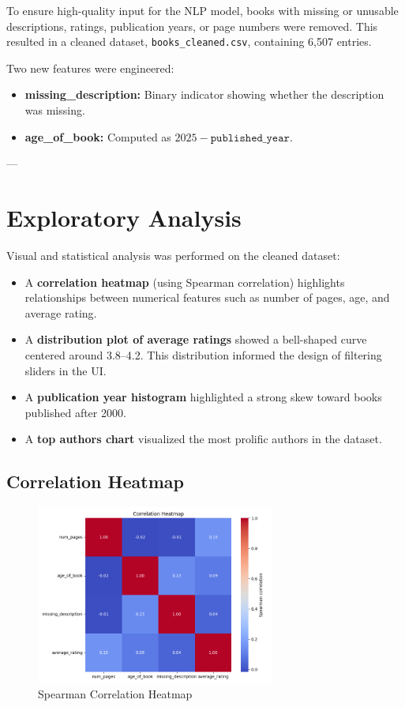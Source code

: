 To ensure high-quality input for the NLP model, books with missing or unusable descriptions, ratings, publication years, or page numbers were removed. 
This resulted in a cleaned dataset, \texttt{books\_cleaned.csv}, containing 6,507 entries.

Two new features were engineered:

\begin{itemize}
    \item \textbf{missing\_description:} Binary indicator showing whether the description was missing.
    \item \textbf{age\_of\_book:} Computed as $2025 - \texttt{published\_year}$.
\end{itemize}

---

\section{Exploratory Analysis}
\label{sec:data-exploration}

Visual and statistical analysis was performed on the cleaned dataset:

\begin{itemize}
    \item A \textbf{correlation heatmap} (using Spearman correlation) highlights relationships between numerical features such as number of pages, age, and average rating.
    \item A \textbf{distribution plot of average ratings} showed a bell-shaped curve centered around 3.8–4.2. This distribution informed the design of filtering sliders in the UI.
    \item A \textbf{publication year histogram} highlighted a strong skew toward books published after 2000.
    \item A \textbf{top authors chart} visualized the most prolific authors in the dataset.
\end{itemize}

\subsection{Correlation Heatmap}
\begin{figure}[H]
    \centering
    \includegraphics[width=0.7\textwidth]{figures/correlation_heatmap.png}
    \caption{Spearman Correlation Heatmap}
    \label{fig:correlation-heatmap}
\end{figure}

